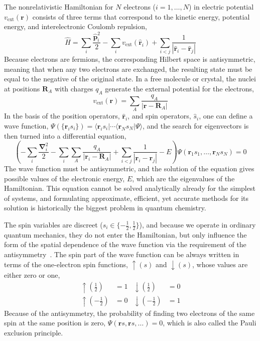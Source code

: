 The nonrelativistic Hamiltonian for $N$ electrons ($i=1,\ldots,N$) in electric potential $v_\text{ext}(\mathbf r)$ consists of three terms that correspond to the kinetic energy, potential energy, and interelectronic Coulomb repulsion,
\begin{equation}
  \hat H=\sum_i\frac{\mathbf{\hat p}_i^2}2-\sum_i v_\text{ext}(\mathbf{\hat r}_i)+\sum_{i<j}\frac1{|\mathbf{\hat r}_i-\mathbf{\hat r}_j|}
  \label{eq:el-hamiltonian}
\end{equation}
Because electrons are fermions, the corresponding Hilbert space is antisymmetric, meaning that when any two electrons are exchanged, the resulting state must be equal to the negative of the original state.
In a free molecule or crystal, the nuclei at positions $\mathbf R_A$ with charges $q_A$ generate the external potential for the electrons,
\begin{equation}
  v_\text{ext}(\mathbf r)=\sum_A\frac{q_A}{|\mathbf r-\mathbf R_A|}
\end{equation}
In the basis of the position operators, $\mathbf{\hat r}_i$, and spin operators, $\hat s_i$, one can define a wave function, $\Psi(\{\mathbf r_i s_i\})=\langle\mathbf r_i s_i|\cdots\langle\mathbf r_N s_N|\Psi\rangle$, and the search for eigenvectors is then turned into a differential equation,
\begin{equation}
  \left(-\sum_i\frac{\boldsymbol\nabla_i^2}2-\sum_i\sum_A\frac{q_A}{|\mathbf r_i-\mathbf R_A|}+\sum_{i<j}\frac1{|\mathbf r_i-\mathbf r_j|}-E\right)\Psi(\mathbf r_1 s_1,\ldots,\mathbf r_N s_N)=0
\end{equation}
The wave function must be antisymmetric, and the solution of the equation gives possible values of the electronic energy, $E$, which are the eigenvalues of the Hamiltonian.
This equation cannot be solved analytically already for the simplest of systems, and formulating approximate, efficient, yet accurate methods for its solution is historically the biggest problem in quantum chemistry.

The spin variables are discreet ($s_i\in\{-\frac12,\frac12\}$), and because we operate in ordinary quantum mechanics, they do not enter the Hamiltonian, but only influence the form of the spatial dependence of the wave function via the requirement of the antisymmetry~\cite{Pauncz79}.
The spin part of the wave function can be always written in terms of the one-electron spin functions, $\uparrow\!(s)$ and $\downarrow\!(s)$, whose values are either zero or one,
\begin{equation}
\begin{aligned}
  \uparrow\!(\tfrac12)&=1 & \downarrow\!(\tfrac12)&=0 \\
  \uparrow\!(-\tfrac12)&=0 & \downarrow\!(-\tfrac12)&=1
\end{aligned}
\end{equation}
Because of the antisymmetry, the probability of finding two electrons of the same spin at the same position is zero, $\Psi(\mathbf rs,\mathbf rs,\ldots)=0$, which is also called the Pauli exclusion principle.

